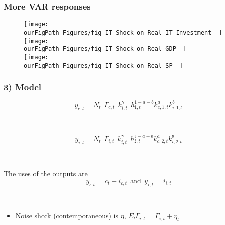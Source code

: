 \documentclass{beamer}
\def \ourFigPath {../../}
\begin{document}
\begin{frame}
\frametitle{More VAR responses}

\vspace{-0.2cm}
\begin{figure}
\begin{multicols}{2}
\centering 
\texttt{[image: \\ourFigPath Figures/fig\_IT\_Shock\_on\_Real\_IT\_Investment\_\_]}\\
\vspace{0.3cm}
\texttt{[image: \\ourFigPath Figures/fig\_IT\_Shock\_on\_Real\_GDP\_\_]}\\ 
\vspace{0.3cm}
\texttt{[image: \\ourFigPath Figures/fig\_IT\_Shock\_on\_Real\_SP\_\_]}\\ 

\end{multicols}
\end{figure}


\end{frame}


\begin{frame}
	\frametitle{3) Model}
	

\begin{equation}\label{eq:prodfuncfinal}
y_{c,t} = N_t  \  \ \Gamma_{c,t}  \  \ k_{i,t}^{\gamma} \ \  h_{1,t}^{1 - a- b} k_{c,1,t}^a k_{i,1,t}^b
\end{equation}

\


\begin{equation}\label{eq:prodfuncinter}
y_{i,t} = N_t \ \ \Gamma_{i,t} \ \ k_{i,t}^{\gamma} \ \  h_{2,t}^{1 - a- b} k_{c,2,t}^a k_{i,2,t}^b
\end{equation}

\

The uses of the outputs are
$$
y_{c,t} = c_t + i_{c,t} \ \ \text{and} \ \ y_{i,t} = i_{i,t}
$$


\

\begin{itemize}
\item Noise shock (contemporaneous) is $\eta$, $E_t \Gamma_{i,t} = \Gamma_{i,t} + \eta_t$
\end{itemize}

\end{frame}
\end{document}
